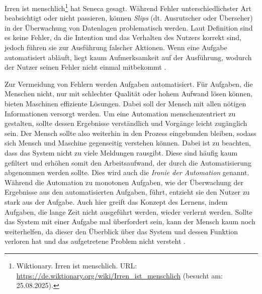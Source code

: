 \glqq Irren ist menschlich\grqq{}\footnote{Wiktionary. Irren ist menschlich. URL: \url{https://de.wiktionary.org/wiki/Irren_ist_menschlich} (besucht am: 25.08.2025).} hat Seneca gesagt. Während Fehler unterschiedlichster Art beabsichtigt oder nicht passieren, können \textit{Slips} (dt. Ausrutscher oder Überseher) in der Überwachung von Datenlagen problematisch werden. Laut Definition sind es keine Fehler, da die Intention und das Verhalten des Nutzers korrekt sind, jedoch führen sie zur Ausführung falscher Aktionen. Wenn eine Aufgabe automatisiert abläuft, liegt kaum Aufmerksamkeit auf der Ausführung, wodurch der Nutzer seinen Fehler nicht einmal mitbekommt \cite[S. 312\psq]{Wickens:2013}.

Zur Vermeidung von Fehlern werden Aufgaben automatisiert. Für Aufgaben, die Menschen nicht, nur mit schlechter Qualität oder hohem Aufwand lösen können, bieten Maschinen effiziente Lösungen.
Dabei soll der Mensch mit allen nötigen Informationen versorgt werden. Um eine Automation menschenzentriert zu gestalten, sollte dessen Ergebnisse verständlich und Vorgänge leicht zugänglich sein. Der Mensch sollte also weiterhin in den Prozess eingebunden bleiben, sodass sich Mensch und Maschine gegenseitig verstehen können. Dabei ist zu beachten, dass das System nicht zu viele Meldungen rausgibt. Diese sind häufig kaum gefiltert und erhöhen somit den Arbeitsaufwand, der durch die Automatisierung abgenommen werden sollte.
Dies wird auch die \textit{Ironie der Automation} genannt. Während die Automation zu monotonen Aufgaben, wie der Überwachung der Ergebnisse aus den automatisierten Aufgaben, führt, entzieht sie den Nutzer zu stark aus der Aufgabe. Auch hier greift das Konzept des Lernens, indem Aufgaben, die lange Zeit nicht ausgeführt werden, wieder verlernt werden. Sollte das System mit einer Aufgabe mal überfordert sein, kann der Mensch kaum noch weiterhelfen, da dieser den Überblick über das System und dessen Funktion verloren hat und das aufgetretene Problem nicht versteht \cites[S. 182, 193, 202\psq]{Vollrath:2015:Taschenbuch}[S. 379\psq]{Wickens:2013}.